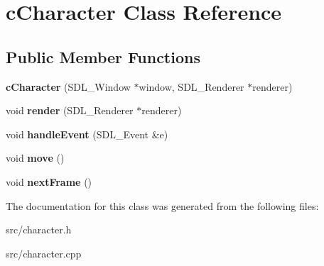 \hypertarget{classc_character}{}\section{c\+Character Class Reference}
\label{classc_character}
\subsection*{Public Member Functions}
\begin{DoxyCompactItemize}
\item 
\mbox{\label{classc_character_ac6d5136a2b2ccbd7332655fc51cde8a5}} 
{\bfseries c\+Character} (S\+D\+L\+\_\+\+Window $\ast$window, S\+D\+L\+\_\+\+Renderer $\ast$renderer)
\item 
\mbox{\label{classc_character_a88778ef797b494c7b15cd58662f7622d}} 
void {\bfseries render} (S\+D\+L\+\_\+\+Renderer $\ast$renderer)
\item 
\mbox{\label{classc_character_a9b0a00c7b43b4bf3706290088e02c046}} 
void {\bfseries handle\+Event} (S\+D\+L\+\_\+\+Event \&e)
\item 
\mbox{\label{classc_character_aba0e96ea693d5ecadd3aaecf9b5c7803}} 
void {\bfseries move} ()
\item 
\mbox{\label{classc_character_a0b5a0f08726d2c4a807b46cc639a60b5}} 
void {\bfseries next\+Frame} ()
\end{DoxyCompactItemize}


The documentation for this class was generated from the following files\+:\begin{DoxyCompactItemize}
\item 
src/character.\+h\item 
src/character.\+cpp\end{DoxyCompactItemize}
